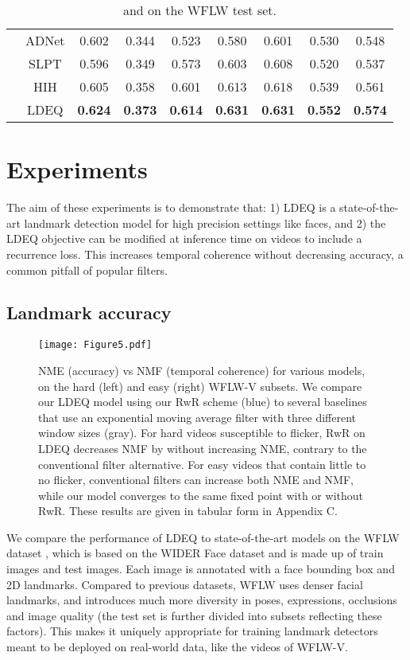 \documentclass[10pt,twocolumn,letterpaper]{article}
\begin{document}
\begin{table}[b!]
{\begin{tabular}{@{}c|c|ccccccc@{}}
                           & ADNet & 0.602 & 0.344 & 0.523 & 0.580 & 0.601 & 0.530 & 0.548 \\
                           & SLPT & 0.596 & 0.349 & 0.573 & 0.603 & 0.608 & 0.520 & 0.537 \\
                           & HIH & 0.605 & 0.358 & 0.601 & 0.613 & 0.618 & 0.539 & 0.561 \\
    \cmidrule{2-9}
    & LDEQ & \textbf{0.624} & \textbf{0.373} & \textbf{0.614} & \textbf{0.631} & \textbf{0.631} & \textbf{0.552} & \textbf{0.574}\\
    \bottomrule
  \end{tabular}
  }
  \caption{ and  on the WFLW test set.}
  \label{tab:WFLW performance AUC FR}
\end{table}

\section{Experiments}

The aim of these experiments is to demonstrate that: 1) LDEQ is a state-of-the-art landmark detection model for high precision settings like faces, and 2) the LDEQ objective can be modified at inference time on videos to include a recurrence loss. This increases temporal coherence without decreasing accuracy, a common pitfall of popular filters. 

\subsection{Landmark accuracy}

\begin{figure*}[t!]
  \centering
   \texttt{[image: Figure5.pdf]}
   \caption{NME (accuracy) vs NMF (temporal coherence) for various models, on the hard (left) and easy (right) WFLW-V subsets. We compare our LDEQ model using our RwR scheme (blue) to several baselines that use an exponential moving average filter with three different window sizes (gray). For hard videos susceptible to flicker, RwR on LDEQ decreases NMF by  without increasing NME, contrary to the conventional filter alternative. For easy videos that contain little to no flicker, conventional filters can increase both NME and NMF, while our model converges to the same fixed point with or without RwR. These results are given in tabular form in Appendix C.} 
   \label{fig:NMEvsNMF}
\end{figure*}

We compare the performance of LDEQ to state-of-the-art models on the WFLW dataset \cite{Wayne2018LookAtBoundary}, which is based on the WIDER Face dataset \cite{Yang2016WiderFace} and is made up of  train images and  test images. Each image is annotated with a face bounding box and  2D landmarks. Compared to previous datasets, WFLW uses denser facial landmarks, and introduces much more diversity in poses, expressions, occlusions and image quality (the test set is further divided into subsets reflecting these factors). This makes it uniquely appropriate for training landmark detectors meant to be deployed on real-world data, like the videos of WFLW-V.
\end{document}
